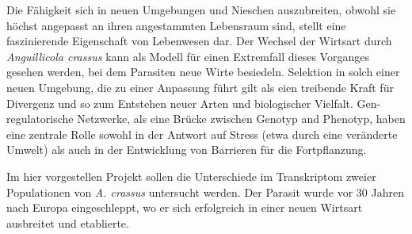 

\begin{zusammenfassung}        %


  Die F\"ahigkeit sich in neuen Umgebungen und Nieschen auszubreiten,
  obwohl sie h\"ochst angepasst an ihren angestammten Lebensraum sind,
  stellt eine faszinierende Eigenschaft von Lebenwesen dar. Der
  Wechsel der Wirtsart durch \textit{Anguillicola crassus} kann als
  Modell f\"ur einen Extremfall dieses Vorganges gesehen werden, bei
  dem Parasiten neue Wirte besiedeln. Selektion in solch einer neuen
  Umgebung, die zu einer Anpassung f\"uhrt gilt als eien treibende
  Kraft f\"ur Divergenz und so zum Entstehen neuer Arten und
  biologischer Vielfalt.  Gen-regulatorische Netzwerke, als eine
  Br\"ucke zwischen Genotyp and Phenotyp, haben eine zentrale Rolle
  sowohl in der Antwort auf Stress (etwa durch eine ver\"anderte
  Umwelt) als auch in der Entwicklung von Barrieren f\"ur die
  Fortpflanzung.

  Im hier vorgestellen Projekt sollen die Unterschiede im Transkriptom
  zweier Populationen von \textit{A. crassus} untersucht werden. Der
  Parasit wurde vor 30 Jahren nach Europa eingeschleppt, wo er sich
  erfolgreich in einer neuen Wirtsart ausbreitet und etablierte.



\end{zusammenfassung}





